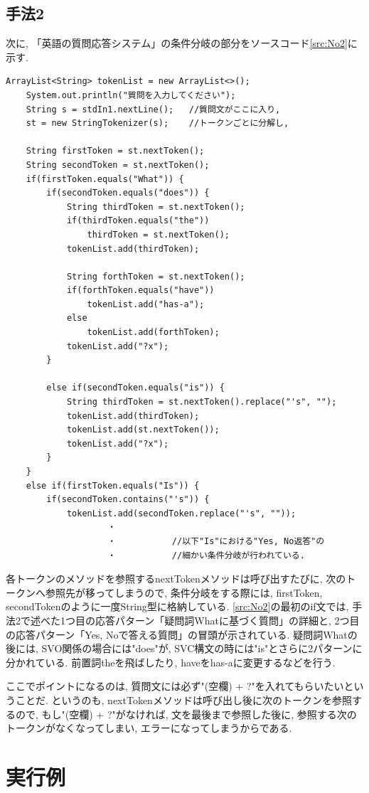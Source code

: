 ﻿\documentclass[uplatex,12pt]{jsarticle}
\begin{document}
\subsection{手法2}
次に, 「英語の質問応答システム」の条件分岐の部分をソースコード\ref{src:No2}に示す.
\begin{lstlisting}[caption=英語における質問応答, label=src:No2]
	ArrayList<String> tokenList = new ArrayList<>();
	System.out.println("質問を入力してください");
	String s = stdIn1.nextLine(); 	//質問文がここに入り,
	st = new StringTokenizer(s);	//トークンごとに分解し,

	String firstToken = st.nextToken();
	String secondToken = st.nextToken();
	if(firstToken.equals("What")) {
		if(secondToken.equals("does")) {
			String thirdToken = st.nextToken();
			if(thirdToken.equals("the")) 
				thirdToken = st.nextToken();
			tokenList.add(thirdToken);
	
			String forthToken = st.nextToken();
			if(forthToken.equals("have"))
				tokenList.add("has-a");
			else
				tokenList.add(forthToken);
			tokenList.add("?x");
		}
	
		else if(secondToken.equals("is")) {
			String thirdToken = st.nextToken().replace("'s", "");
			tokenList.add(thirdToken);
			tokenList.add(st.nextToken());
			tokenList.add("?x");
		}
	}
	else if(firstToken.equals("Is")) {
		if(secondToken.contains("'s")) {
			tokenList.add(secondToken.replace("'s", ""));
					・
					・	   		//以下"Is"における"Yes, No返答"の
					・			//細かい条件分岐が行われている.

\end{lstlisting}

各トークンのメソッドを参照するnextTokenメソッドは呼び出すたびに, 次のトークンへ参照先が移ってしまうので, 条件分岐をする際には, firstToken, secondTokenのように一度String型に格納している. \ref{src:No2}の最初のif文では, 手法2で述べた1つ目の応答パターン「疑問詞Whatに基づく質問」の詳細と, 2つ目の応答パターン「Yes, Noで答える質問」の冒頭が示されている. 疑問詞Whatの後には, SVO関係の場合には"does"が, SVC構文の時には"is"とさらに2パターンに分かれている. 前置詞theを飛ばしたり, haveをhas-aに変更するなどを行う. 

ここでポイントになるのは, 質問文には必ず"(空欄) + ?"を入れてもらいたいということだ. というのも, nextTokenメソッドは呼び出し後に次のトークンを参照するので, もし"(空欄) + ?"がなければ, 文を最後まで参照した後に, 参照する次のトークンがなくなってしまい, エラーになってしまうからである.

\section{実行例}
\end{document}

